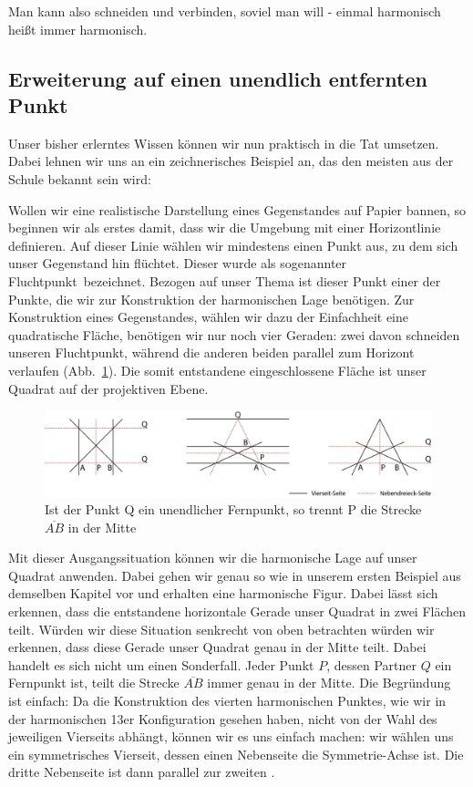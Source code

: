 \documentclass[12pt,a4paper]{article}
\begin{document}
\glqq Man kann also schneiden und verbinden, soviel man will - einmal harmonisch heißt immer harmonisch.~\citep[s.~][S.~49]{projektiveGeometrie}\grqq

\newpage
\subsection{Erweiterung auf einen unendlich entfernten Punkt}

Unser bisher erlerntes Wissen können wir nun praktisch in die Tat umsetzen. Dabei lehnen wir uns an ein zeichnerisches Beispiel an, das den meisten aus der Schule bekannt sein wird:

Wollen wir eine realistische Darstellung eines Gegenstandes auf Papier bannen, so beginnen wir als erstes damit, dass wir die Umgebung mit einer Horizontlinie definieren. Auf dieser Linie wählen wir mindestens einen Punkt aus, zu dem sich unser Gegenstand hin \glqq flüchtet\grqq . Dieser wurde als sogenannter \glqq Fluchtpunkt\grqq ~bezeichnet. Bezogen auf unser Thema ist dieser Punkt einer der Punkte, die wir zur Konstruktion der harmonischen Lage benötigen. Zur Konstruktion eines Gegenstandes, wählen wir dazu der Einfachheit eine quadratische Fläche, benötigen wir nur noch vier Geraden: zwei davon schneiden unseren Fluchtpunkt, während die anderen beiden parallel zum Horizont verlaufen (Abb.~\ref{fig:inftyPoint}). Die somit entstandene eingeschlossene Fläche ist unser Quadrat auf der projektiven Ebene.

\begin{figure}[htbp]
\centering
\includegraphics[width=\textwidth]{Bilder/inftyPoint.png}
\caption{Ist der Punkt Q ein unendlicher Fernpunkt, so trennt P die Strecke $\overline{A B}$ in der Mitte}
\label{fig:inftyPoint}
\end{figure}

Mit dieser Ausgangssituation können wir die harmonische Lage auf unser Quadrat anwenden. Dabei gehen wir genau so wie in unserem ersten Beispiel aus demselben Kapitel vor und erhalten eine harmonische Figur. Dabei lässt sich erkennen, dass die entstandene horizontale Gerade unser Quadrat in zwei Flächen teilt. Würden wir diese Situation senkrecht von oben betrachten würden wir erkennen, dass diese Gerade unser Quadrat genau in der Mitte teilt. Dabei handelt es sich nicht um einen Sonderfall. Jeder Punkt $P$, dessen Partner $Q$ ein Fernpunkt ist, teilt die Strecke $\overline{A B}$ immer genau in der Mitte.
\newline
Die Begründung ist einfach: Da die Konstruktion des vierten harmonischen Punktes, wie wir in der harmonischen 13er Konfiguration gesehen haben, nicht von der Wahl des jeweiligen Vierseits abhängt, können wir es uns einfach machen: wir wählen uns ein symmetrisches Vierseit, dessen einen Nebenseite die Symmetrie-Achse ist. Die dritte Nebenseite ist dann parallel zur zweiten \citep[vgl.~][S.~50]{projektiveGeometrie}.
\end{document}
